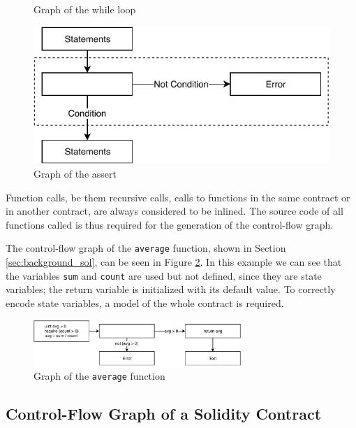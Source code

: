 \begin{figure}[ht]
\begin{minipage}[h]{0.43\textwidth}
    \caption{Graph of the while loop}
    \label{fig:cfg_while}
  \end{minipage}
  \begin{minipage}[h]{0.43\textwidth}
  	\centering
    \includegraphics[width=\textwidth]{images/assert}
    \caption{Graph of the assert}
    \label{fig:cfg_assert}
  \end{minipage}
\end{figure}

Function calls, be them  recursive calls, calls to functions in the same contract or in another contract, are always considered to be inlined. The source code of all functions called is thus required for the generation of the control-flow graph.

The control-flow graph of the \texttt{average} function, shown in Section \ref{sec:background_sol}, can be seen in Figure \ref{fig:cfg_average}. In this example we can see that the variables \texttt{sum} and \texttt{count} are used but not defined, since they are state variables; the return variable is initialized with its default value. To correctly encode state variables, a model of the whole contract is required.

\begin{figure}[ht]
	\centering
	\includegraphics[width=0.7\textwidth]{images/average}
	\caption{Graph of the \texttt{average} function}
	\label{fig:cfg_average}
\end{figure}


\subsection{Control-Flow Graph of a Solidity Contract} \label{sec:sol_cfg_con}

